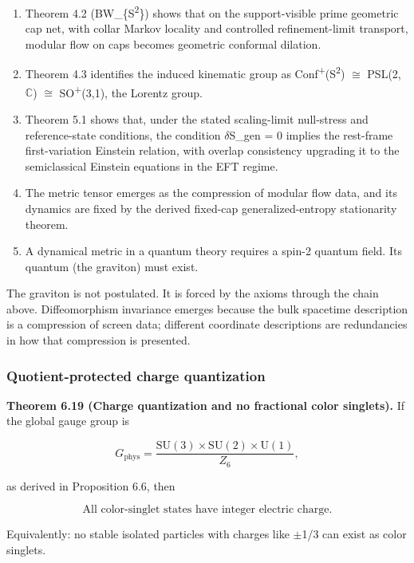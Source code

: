 \begin{enumerate}
\def\labelenumi{\arabic{enumi}.}
\tightlist
\item
  Theorem 4.2 (BW\_\{S\textsuperscript{2}\}) shows that on the support-visible prime geometric cap net, with collar Markov locality and controlled refinement-limit transport, modular flow on caps becomes geometric conformal dilation.
\item
  Theorem 4.3 identifies the induced kinematic group as Conf\textsuperscript{+}(S\textsuperscript{2}) \ensuremath{\cong} PSL(2,\ensuremath{\mathbb{C}}) \ensuremath{\cong} SO\textsuperscript{+}(3,1), the Lorentz group.
\item
  Theorem 5.1 shows that, under the stated scaling-limit null-stress and reference-state conditions, the condition \ensuremath{\delta}S\_gen = 0 implies the rest-frame first-variation Einstein relation, with overlap consistency upgrading it to the semiclassical Einstein equations in the EFT regime.
\item
  The metric tensor emerges as the compression of modular flow data, and its dynamics are fixed by the derived fixed-cap generalized-entropy stationarity theorem.
\item
  A dynamical metric in a quantum theory requires a spin-2 quantum field. Its quantum (the graviton) must exist.
\end{enumerate}

The graviton is not postulated. It is forced by the axioms through the chain above. Diffeomorphism invariance emerges because the bulk spacetime description is a compression of screen data; different coordinate descriptions are redundancies in how that compression is presented.

\subsubsection{Quotient-protected charge quantization}\label{612-mass-predictions-from-symmetry}

\textbf{Theorem 6.19 (Charge quantization and no fractional color singlets).} If the global gauge group is

\[
G_{\mathrm{phys}} = \frac{\mathrm{SU}(3) \times \mathrm{SU}(2) \times \mathrm{U}(1)}{Z_6},
\]

as derived in Proposition 6.6, then

\[
\text{All color-singlet states have integer electric charge.}
\]

Equivalently: no stable isolated particles with charges like \ensuremath{\pm}1/3 can exist as color singlets.

